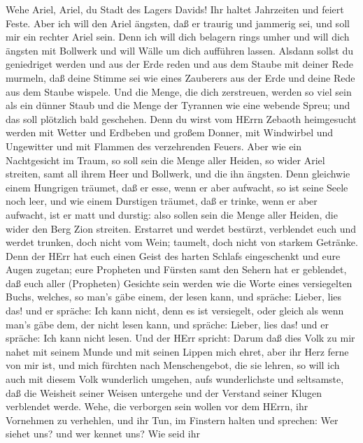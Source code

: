  Wehe Ariel, Ariel, du Stadt des Lagers Davids! Ihr haltet
Jahrzeiten und feiert Feste.  Aber ich will den Ariel
ängsten, daß er traurig und jammerig sei, und soll mir ein rechter Ariel
sein.  Denn ich will dich belagern rings umher und will dich
ängsten mit Bollwerk und will Wälle um dich aufführen lassen.
 Alsdann sollst du geniedriget werden und aus der Erde reden
und aus dem Staube mit deiner Rede murmeln, daß deine Stimme sei wie
eines Zauberers aus der Erde und deine Rede aus dem Staube wispele.
 Und die Menge, die dich zerstreuen, werden so viel sein als
ein dünner Staub und die Menge der Tyrannen wie eine webende Spreu; und
das soll plötzlich bald geschehen.  Denn du wirst vom HErrn
Zebaoth heimgesucht werden mit Wetter und Erdbeben und großem Donner,
mit Windwirbel und Ungewitter und mit Flammen des verzehrenden Feuers.
 Aber wie ein Nachtgesicht im Traum, so soll sein die Menge
aller Heiden, so wider Ariel streiten, samt all ihrem Heer und Bollwerk,
und die ihn ängsten.  Denn gleichwie einem Hungrigen
träumet, daß er esse, wenn er aber aufwacht, so ist seine Seele noch
leer, und wie einem Durstigen träumet, daß er trinke, wenn er aber
aufwacht, ist er matt und durstig: also sollen sein die Menge aller
Heiden, die wider den Berg Zion streiten.  Erstarret und
werdet bestürzt, verblendet euch und werdet trunken, doch nicht vom
Wein; taumelt, doch nicht von starkem Getränke.  Denn der
HErr hat euch einen Geist des harten Schlafs eingeschenkt und eure Augen
zugetan; eure Propheten und Fürsten samt den Sehern hat er geblendet,
 daß euch aller (Propheten) Gesichte sein werden wie die
Worte eines versiegelten Buchs, welches, so man's gäbe einem, der lesen
kann, und spräche: Lieber, lies das! und er spräche: Ich kann nicht,
denn es ist versiegelt,  oder gleich als wenn man's gäbe
dem, der nicht lesen kann, und spräche: Lieber, lies das! und er
spräche: Ich kann nicht lesen.  Und der HErr spricht: Darum
daß dies Volk zu mir nahet mit seinem Munde und mit seinen Lippen mich
ehret, aber ihr Herz ferne von mir ist, und mich fürchten nach
Menschengebot, die sie lehren,  so will ich auch mit diesem
Volk wunderlich umgehen, aufs wunderlichste und seltsamste, daß die
Weisheit seiner Weisen untergehe und der Verstand seiner Klugen
verblendet werde.  Wehe, die verborgen sein wollen vor dem
HErrn, ihr Vornehmen zu verhehlen, und ihr Tun, im Finstern halten und
sprechen: Wer siehet uns? und wer kennet uns?  Wie seid ihr
